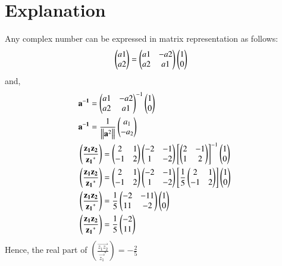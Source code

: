 \documentclass[journal,12pt,twocolumn]{IEEEtran}
\begin{document}
\section{Explanation}
Any complex number can be expressed in matrix representation as follows:
\begin{align}  
& \begin{pmatrix}a1\\ a2\end{pmatrix} = \begin{pmatrix}a1 & -a2\\ a2 & a1\end{pmatrix}\begin{pmatrix}1\\ 0\end{pmatrix}\label{eq:eqn_1}
\end{align}
and,
\begin{align}
&\mathbf{a^{-1}}=\begin{pmatrix}a1 & -a2\\ a2 & a1\end{pmatrix}^{-1}\begin{pmatrix}1\\ 0\end{pmatrix}\label{eq:eqn_2}\\
&\mathbf{a^{-1}}=\frac{1}{\left\lVert\mathbf{a}^2\right\rVert}\begin{pmatrix}a_1\\ -a_2\end{pmatrix}\label{eq:eqn_3}\\
&\left(\frac{\mathbf{z_1z_2}}{\mathbf{z_1}^*}\right)=\begin{pmatrix}2 & 1\\ -1 & 2\end{pmatrix}\begin{pmatrix}-2 & -1\\ 1 & -2\end{pmatrix}\left[\begin{pmatrix}2 & -1\\ 1 & 2\end{pmatrix}\right]^{-1}\begin{pmatrix}1 \\0\end{pmatrix}\label{eq:eqn_4}\\
&\left(\frac{\mathbf{z_1z_2}}{\mathbf{z_1}^*}\right)=\begin{pmatrix}2 & 1\\ -1 & 2\end{pmatrix}\begin{pmatrix}-2 & -1\\ 1 & -2\end{pmatrix}\left[\frac{1}{5}\begin{pmatrix}2 & 1\\ -1 & 2\end{pmatrix}\right]\begin{pmatrix}1 \\0\end{pmatrix}\label{eq:eqn_5}\\
&\left(\frac{\mathbf{z_1z_2}}{\mathbf{z_1}^*}\right)=\frac{1}{5}\begin{pmatrix}-2 & -11\\ 11 & -2\end{pmatrix}\begin{pmatrix}1 \\0\end{pmatrix}\label{eq:eqn_6}\\
&\left(\frac{\mathbf{z_1z_2}}{\mathbf{z_1}^*}\right)=\frac{1}{5}\begin{pmatrix}-2 \\11\end{pmatrix}\label{eq:eqn_7}
\end{align}
Hence, the real part of $\left(\frac{\vec{z_1z_2}}{\vec{z_1}^*}\right)=-\frac{2}{5}$
\end{document}
